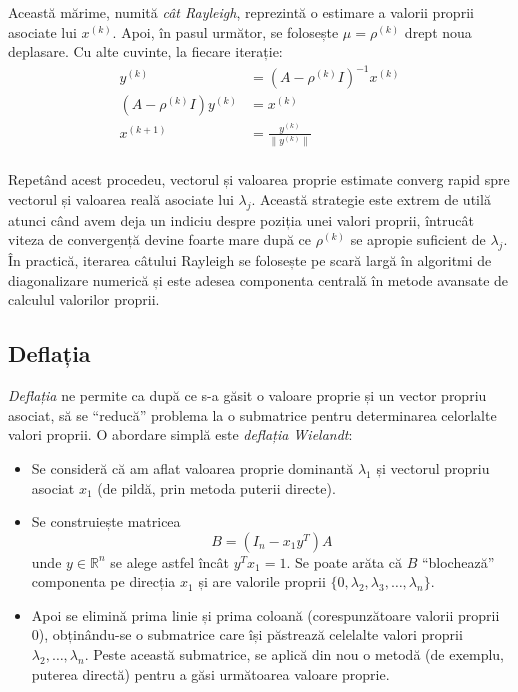 \documentclass{exam}
\begin{document}
Această mărime, numită \textit{cât Rayleigh}, reprezintă o estimare a valorii
proprii asociate lui $x^{(k)}$. Apoi, în pasul următor, se folosește
$\mu = \rho^{(k)}$ drept noua deplasare. Cu alte cuvinte, la fiecare iterație:
\begin{align*}
	y^{(k)}                    & = (A - \rho^{(k)} I)^{-1} x^{(k)} \\
	(A - \rho^{(k)} I) y^{(k)} & = x^{(k)}                         \\
	x^{(k+1)}                  & = \frac{y^{(k)}}{\|y^{(k)}\|}     \\
\end{align*}

Repetând acest procedeu, vectorul și valoarea proprie estimate converg rapid
spre vectorul și valoarea reală asociate lui $\lambda_j$. Această strategie este
extrem de utilă atunci când avem deja un indiciu despre poziția unei valori
proprii, întrucât viteza de convergență devine foarte mare după ce $\rho^{(k)}$
se apropie suficient de $\lambda_j$. În practică, iterarea câtului Rayleigh se
folosește pe scară largă în algoritmi de diagonalizare numerică și este adesea
componenta centrală în metode avansate de calculul valorilor proprii.

\subsection{Deflația}

\textit{Deflația} ne permite ca după ce s-a găsit o valoare proprie și un vector
propriu asociat, să se “reducă” problema la o submatrice pentru determinarea
celorlalte valori proprii. O abordare simplă este \textit{deflația Wielandt}:

\begin{itemize}
	\item Se consideră că am aflat valoarea proprie dominantă $\lambda_1$ și
	      vectorul propriu asociat $x_1$ (de pildă, prin metoda puterii directe).
	\item Se construiește matricea
	      \begin{equation*}
		      B = (I_n - x_1 y^T) A
	      \end{equation*}
	      unde $y \in \mathbb{R}^n$ se alege astfel încât $y^T x_1 = 1$. Se
	      poate arăta că $B$ “blochează” componenta pe direcția $x_1$ și are
	      valorile proprii $\{0, \lambda_2, \lambda_3, \dots,\lambda_n\}$.
	\item Apoi se elimină prima linie și prima coloană (corespunzătoare valorii
	      proprii 0), obținându-se o submatrice care își păstrează celelalte valori
	      proprii $\lambda_2,\ldots,\lambda_n$. Peste această submatrice, se aplică
	      din nou o metodă (de exemplu, puterea directă) pentru a găsi următoarea
	      valoare proprie.
\end{itemize}
\end{document}
